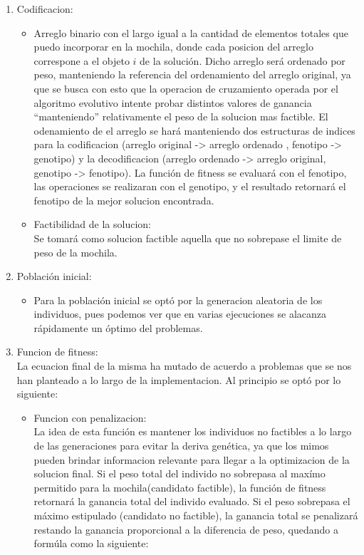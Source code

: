 \documentclass[9pt,conference]{IEEEtran}
\begin{document}
	\begin{enumerate}
	
	\item Codificacion:
		\begin{itemize}	

		\item Arreglo binario con el largo igual a la cantidad de elementos totales que puedo incorporar en la mochila, donde cada posicion del arreglo correspone a el objeto $i$ de la soluci\'on. Dicho arreglo ser\'a ordenado por peso, manteniendo la referencia del ordenamiento del arreglo original, ya que se busca con esto que la operacion de cruzamiento operada por el algoritmo evolutivo intente probar distintos valores de ganancia ``manteniendo'' relativamente el peso de la solucion mas factible.
		El odenamiento de el arreglo se har\'a manteniendo dos estructuras de indices para la codificacion (arreglo original -> arreglo ordenado , fenotipo -> genotipo) y la decodificacion (arreglo ordenado -> arreglo original, genotipo -> fenotipo).
		La funci\'on de fitness se evaluar\'a con el fenotipo, las operaciones se realizaran con el genotipo, y el resultado retornar\'a el fenotipo de la mejor solucion encontrada.

		\item Factibilidad de la solucion:\\ 
			Se tomar\'a como solucion factible aquella que no sobrepase el limite de peso de la mochila.
		\end{itemize}	
			
	\item Poblaci\'on inicial:\\
		\begin{itemize}	
		\item Para la poblaci\'on inicial se opt\'o por la generacion aleatoria de los individuos, pues podemos ver que en varias ejecuciones se alacanza r\'apidamente un \'optimo del problemas.
		\end{itemize}	
		
	\item Funcion de fitness:\\
			La ecuacion final de la misma ha mutado de acuerdo a problemas que se nos han planteado a lo largo de la implementacion. Al principio se opt\'o por lo siguiente:	
		\begin{itemize}	
			\item Funcion con penalizacion:\\
			La idea de esta funci\'on es mantener los individuos no factibles a lo largo de las generaciones para evitar la deriva gen\'etica, ya que los mimos pueden brindar informacion relevante para llegar a la optimizacion de la solucion final.
			Si el peso total del individo no sobrepasa al max\'imo permitido para la mochila(candidato factible), la funci\'on de fitness retornar\'a la ganancia total del individo evaluado.
			Si el peso sobrepasa el m\'aximo estipulado (candidato no factible), la ganancia total se penalizar\'a restando la ganancia proporcional a la diferencia de peso, quedando a form\'ula como la siguiente:


\end{itemize}
\end{enumerate}
\end{document}
